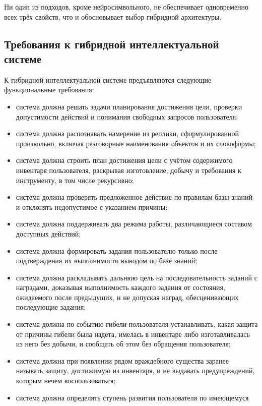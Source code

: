 Ни один из подходов, кроме нейросимвольного, не обеспечивает одновременно всех
трёх свойств, что и обосновывает выбор гибридной архитектуры.

\subsection{Требования к гибридной интеллектуальной системе}

К гибридной интеллектуальной системе предъявляются следующие функциональные
требования:

\begin{itemize}
  \item система должна решать задачи планирования достижения цели, проверки
        допустимости действий и понимания свободных запросов пользователя;
  \item система должна распознавать намерение из реплики, сформулированной
        произвольно, включая разговорные наименования объектов и их словоформы;
  \item система должна строить план достижения цели с учётом содержимого инвентаря
        пользователя, раскрывая изготовление, добычу и требования к инструменту,
        в том числе рекурсивно;
  \item система должна проверять предложенное действие по правилам базы знаний и
        отклонять недопустимое с указанием причины;
  \item система должна поддерживать два режима работы, различающиеся составом
        доступных действий;
  \item система должна формировать задания пользователю только после подтверждения
        их выполнимости выводом по базе знаний;
  \item система должна раскладывать дальнюю цель на последовательность заданий с
        наградами, доказывая выполнимость каждого задания от состояния, ожидаемого
        после предыдущих, и не допуская наград, обесценивающих последующие задания;
  \item система должна по событию гибели пользователя устанавливать, какая защита от
        причины гибели была надета, имелась в инвентаре либо изготавливалась из него
        без добычи, и сообщать об этом без обращения пользователя;
  \item система должна при появлении рядом враждебного существа заранее называть
        защиту, достижимую из инвентаря, и не выдавать предупреждений, которым нечем
        воспользоваться;
  \item система должна определять ступень развития пользователя по имеющемуся

\end{itemize}
